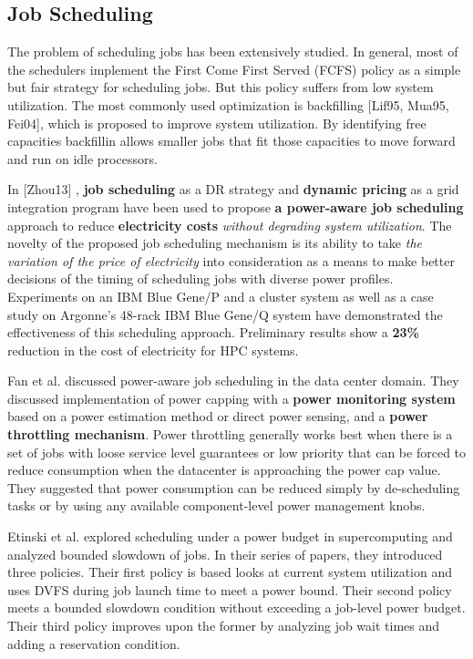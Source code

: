 \subsection{Job Scheduling}
The problem of scheduling jobs has been extensively studied. In general,
most of the schedulers implement the First Come First Served (FCFS) policy
as a simple but fair strategy for scheduling jobs. But this policy suffers
from low system utilization. The most commonly used optimization is backfilling
\cite{lifka_anl/ibm_1995} 
\cite{mualem_utilization_2001}
\cite{feitelson_parallel_2004}
[Lif95, Mua95, Fei04], which is proposed to improve system
utilization. By identifying free capacities backfillin allows smaller
jobs that fit those capacities to move forward and run on idle processors.

In \cite{zhou_reducing_2013} [Zhou13] , \textbf{job scheduling} as a DR strategy and
\textbf{dynamic pricing} as a grid integration program have been used to
propose \textbf{a power-aware job scheduling} approach to reduce
\textbf{electricity costs} \textit{without degrading system utilization}. 
The novelty of the proposed job scheduling
mechanism is its ability to take \textit{the variation of 
the price of electricity }into consideration as a means to make
better decisions of the timing of scheduling jobs with diverse power
profiles. Experiments on an IBM Blue Gene/P and a cluster system as
well as a case study on Argonne's 48-rack IBM Blue Gene/Q system have
demonstrated the effectiveness of this scheduling approach. Preliminary
results show a \textbf{23{\%}} reduction in the cost of electricity for HPC systems.

Fan et al. \cite{PowerAwareServer1} discussed power-aware job scheduling in the data center domain. 
They discussed implementation of power capping with a \textbf{power monitoring system} based on a power estimation
method or direct power sensing, and a \textbf{power throttling mechanism}. Power throttling generally works best when there is 
a set of jobs with loose service level guarantees or low priority that can be
forced to reduce consumption when the datacenter is approaching the power cap value. They suggested that power consumption 
can be reduced simply by de-scheduling tasks or by using any available component-level power management knobs.

Etinski et al. \cite{Etinski1,Etinski2,Etinski3,Etinski4} explored scheduling under a power budget in supercomputing and analyzed bounded slowdown of jobs. In their series of papers, they introduced three policies. Their first policy is based looks at current system utilization and uses DVFS during job launch time to meet a power bound. Their second policy meets a bounded slowdown condition without exceeding a job-level power budget. Their third policy improves upon the former by analyzing job wait times and adding a reservation condition. 


